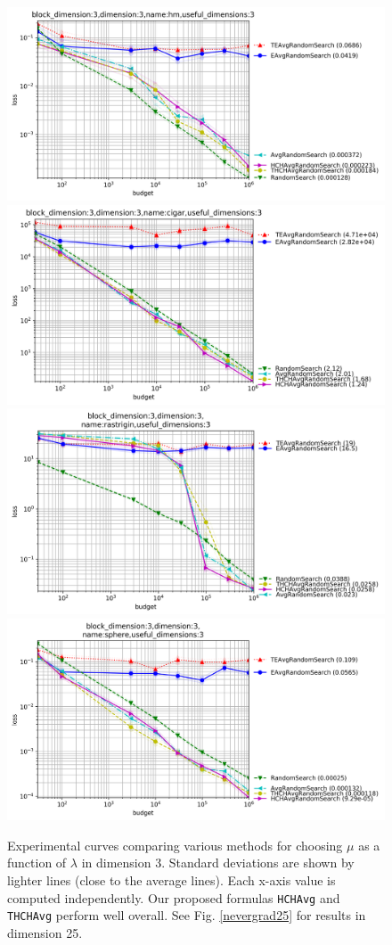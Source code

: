 \begin{figure}[t]
\centering
\includegraphics[trim={0 0 0 2}, clip, width=.47\textwidth]{sections/appendix/ppsn2020-kbest/imgs/hugewidedoenonw/xpresults_block_dimension3,dimension3,namehm,useful_dimensions3.png}
\includegraphics[trim={0 0 0 2}, clip, width=.47\textwidth]{sections/appendix/ppsn2020-kbest/imgs/hugewidedoenonw/xpresults_block_dimension3,dimension3,namecigar,useful_dimensions3.png}
\includegraphics[trim={0 0 0 20}, clip, width=.47\textwidth]{sections/appendix/ppsn2020-kbest/imgs/hugewidedoenonw/xpresults_block_dimension3,dimension3,namerastrigin,useful_dimensions3.png}
\includegraphics[trim={0 0 0 20}, clip, width=.47\textwidth]{sections/appendix/ppsn2020-kbest/imgs/hugewidedoenonw/xpresults_block_dimension3,dimension3,namesphere,useful_dimensions3.png}\caption{\label{nevergrad}Experimental curves comparing various methods for choosing $\mu$ as a function of $\lambda$ in dimension $3$. Standard deviations are shown by lighter lines (close to the average lines). Each x-axis value is computed independently. Our proposed formulas \texttt{HCHAvg} and \texttt{THCHAvg} perform well overall. See Fig. \ref{nevergrad25} for results in dimension 25.}
\end{figure}

